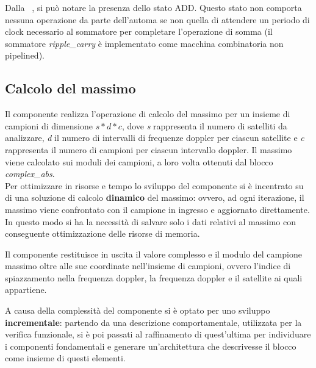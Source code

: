 \documentclass[12pt,a4paper,twoside,openany]{book}
\begin{document}

Dalla \figurename~, si può notare la presenza dello stato ADD. Questo stato non comporta nessuna operazione da parte dell'automa se non quella di attendere un periodo di clock necessario al sommatore per completare l'operazione di somma (il sommatore \textit{ripple\_carry} è implementato come macchina combinatoria non pipelined).
\clearpage
\subsection{Calcolo del massimo}
Il componente realizza l'operazione di calcolo del massimo per un insieme di campioni di dimensione $s*d*c$, dove \textit{s} rappresenta il numero di satelliti da analizzare, \textit{d} il numero di intervalli di frequenze doppler per ciascun satellite e \textit{c} rappresenta il numero di campioni per ciascun intervallo doppler. Il massimo viene calcolato sui moduli dei campioni, a loro volta ottenuti dal blocco \textit{complex\_abs}.\\
Per ottimizzare in risorse e tempo lo sviluppo del componente si è incentrato su di una soluzione di calcolo \textbf{dinamico} del massimo: ovvero, ad ogni iterazione, il massimo viene confrontato con il campione in ingresso e aggiornato direttamente. In questo modo si ha la necessità di salvare solo i dati relativi al massimo con conseguente ottimizzazione delle risorse di memoria.

Il componente restituisce in uscita il valore complesso e il modulo del campione massimo oltre alle sue coordinate nell'insieme di campioni, ovvero l'indice di spiazzamento nella frequenza doppler, la frequenza doppler e il satellite ai quali appartiene.

A causa della complessità del componente si è optato per uno sviluppo \textbf{incrementale}: partendo da una descrizione comportamentale, utilizzata per la verifica funzionale, si è poi passati al raffinamento di quest'ultima per individuare i componenti fondamentali e generare un'architettura che descrivesse il blocco come insieme di questi elementi. 
\end{document}
